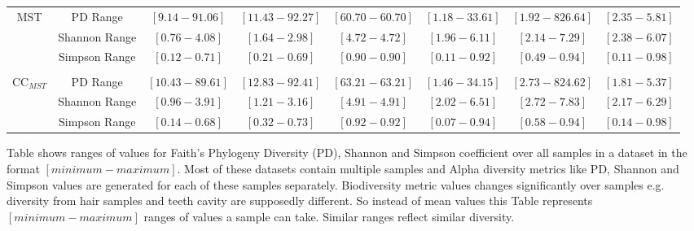 \documentclass[10pt, conference, compsocconf]{IEEEtran}
\begin{document}
\begin{table}[t]
{\begin{tabular}{|c|c c c c| c c c|}
			\hline
			
			\multirow{3}{*}{MST} & PD Range & $\left[9.14-91.06\right]$ & $\left[11.43-92.27\right]$ & $\left[60.70-60.70\right]$ & $\left[1.18-33.61\right]$ & $\left[1.92-826.64\right]$ & $\left[2.35-5.81\right]$\\ 
			& Shannon Range & $\left[0.76-4.08\right]$ & $\left[1.64-2.98\right]$ & $\left[4.72-4.72\right]$ & $\left[1.96-6.11\right]$ & $\left[2.14-7.29\right]$ & $\left[2.38-6.07\right]$\\
			& Simpson Range & $\left[0.12-0.71\right]$ & $\left[0.21-0.69\right]$ & $\left[0.90-0.90\right]$ & $\left[0.11-0.92\right]$ & $\left[0.49-0.94\right]$ & $\left[0.11-0.98\right]$\\
			
			& & & & & & & \\
			
			\multirow{3}{*}{CC$_{MST}$} & PD Range & $\left[10.43-89.61\right]$ & $\left[12.83-92.41\right]$ & $\left[63.21-63.21\right]$ & $\left[1.46-34.15\right]$ & $\left[2.73-824.62\right]$ & $\left[1.81-5.37\right]$\\ 
			& Shannon Range & $\left[0.96-3.91\right]$ & $\left[1.21-3.16\right]$ & $\left[4.91-4.91\right]$ & $\left[2.02-6.51\right]$ & $\left[2.72-7.83\right]$ & $\left[2.17-6.29\right]$\\
			& Simpson Range & $\left[0.14-0.68\right]$ & $\left[0.32-0.73\right]$ & $\left[0.92-0.92\right]$ & $\left[0.07-0.94\right]$ & $\left[0.58-0.94\right]$ & $\left[0.14-0.98\right]$\\
			
			\hline
			
		\end{tabular}
	}
	\small
	\begin{tablenotes}
		\item Table shows ranges of values for Faith’s Phylogeny Diversity (PD), Shannon and Simpson coefficient over all samples in a dataset in the format $[minimum-maximum]$. Most of these datasets contain multiple samples and Alpha diversity metrics like PD, Shannon and Simpson values are generated for each of these samples separately. Biodiversity metric values changes significantly over samples e.g. diversity from hair samples and teeth cavity are supposedly different. So instead of mean values this Table represents $[minimum-maximum]$  ranges of values a sample can take. Similar ranges reflect similar diversity.      
	\end{tablenotes}
	
\end{table}
\end{document}
